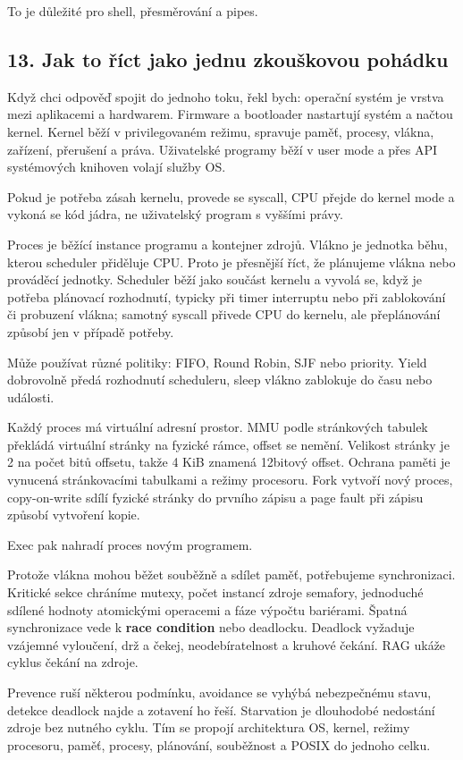 To je důležité pro shell, přesměrování a pipes.

\subsection*{13. Jak to říct jako jednu zkouškovou pohádku}

Když chci odpověď spojit do jednoho toku, řekl bych: operační systém je vrstva mezi aplikacemi a hardwarem. Firmware a bootloader nastartují systém a načtou kernel. Kernel běží v privilegovaném režimu, spravuje paměť, procesy, vlákna, zařízení, přerušení a práva. Uživatelské programy běží v user mode a přes API systémových knihoven volají služby OS.

Pokud je potřeba zásah kernelu, provede se syscall, CPU přejde do kernel mode a vykoná se kód jádra, ne uživatelský program s vyššími právy.

Proces je běžící instance programu a kontejner zdrojů. Vlákno je jednotka běhu, kterou scheduler přiděluje CPU. Proto je přesnější říct, že plánujeme vlákna nebo prováděcí jednotky. Scheduler běží jako součást kernelu a vyvolá se, když je potřeba plánovací rozhodnutí, typicky při timer interruptu nebo při zablokování či probuzení vlákna; samotný syscall přivede CPU do kernelu, ale přeplánování způsobí jen v případě potřeby.

Může používat různé politiky: FIFO, Round Robin, SJF nebo priority. Yield dobrovolně předá rozhodnutí scheduleru, sleep vlákno zablokuje do času nebo události.

Každý proces má virtuální adresní prostor. MMU podle stránkových tabulek překládá virtuální stránky na fyzické rámce, offset se nemění. Velikost stránky je 2 na počet bitů offsetu, takže 4 KiB znamená 12bitový offset. Ochrana paměti je vynucená stránkovacími tabulkami a režimy procesoru. Fork vytvoří nový proces, copy-on-write sdílí fyzické stránky do prvního zápisu a page fault při zápisu způsobí vytvoření kopie.

Exec pak nahradí proces novým programem.

Protože vlákna mohou běžet souběžně a sdílet paměť, potřebujeme synchronizaci. Kritické sekce chráníme mutexy, počet instancí zdroje semafory, jednoduché sdílené hodnoty atomickými operacemi a fáze výpočtu bariérami. Špatná synchronizace vede k \textbf{race condition} nebo deadlocku. Deadlock vyžaduje vzájemné vyloučení, drž a čekej, neodebíratelnost a kruhové čekání. RAG ukáže cyklus čekání na zdroje.

Prevence ruší některou podmínku, avoidance se vyhýbá nebezpečnému stavu, detekce deadlock najde a zotavení ho řeší. Starvation je dlouhodobé nedostání zdroje bez nutného cyklu. Tím se propojí architektura OS, kernel, režimy procesoru, paměť, procesy, plánování, souběžnost a POSIX do jednoho celku.

